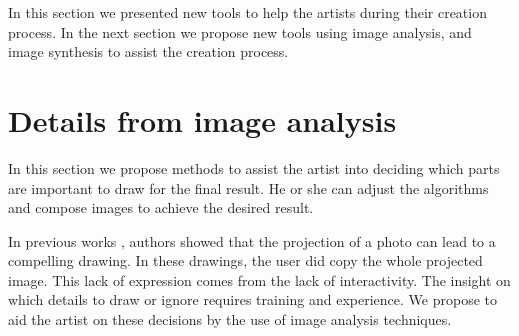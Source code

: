 \documentclass{sigchi}
\begin{document}
    





    
In this section we presented new tools to help the artists during
their creation process. In the next section we propose new tools
using image analysis, and image synthesis to assist the creation
process.  


\section{Details from image analysis}

In this section we propose methods to assist the artist into deciding
which parts are important to draw for the final result. He or she can
adjust the algorithms and compose images to achieve the desired
result.  


In previous works \cite{laviole:2012}, authors showed that the
projection of a photo can lead to a compelling drawing.
In these drawings, the user did copy the whole projected image. 
This lack of expression comes from the lack of interactivity.
The insight on which
details to draw or ignore requires training and experience. 
We propose to aid the artist on these decisions by the use of image
analysis techniques. 
\end{document}
